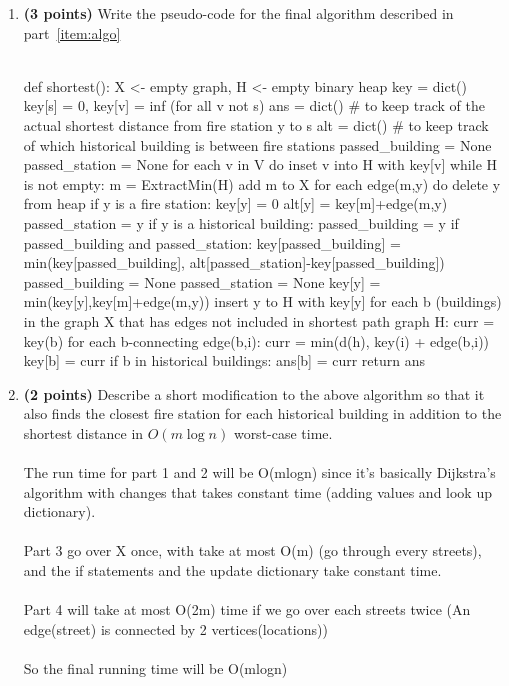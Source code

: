 \documentclass{assignment-373}
\begin{document}
\begin{enumerate}
  
  
\item \textbf{(3 points)} Write the pseudo-code for the final
  algorithm described in part~\ref{item:algo}
  \\\\
  \begin{python}
  def shortest():
    X <- empty graph, H <- empty binary heap
    key = dict()
    key[s] = 0, key[v] = inf (for all v not s)
    ans = dict()
    # to keep track of the actual shortest distance from fire station y to s
    alt = dict() 
    # to keep track of which historical building is between fire stations
    passed_building = None
    passed_station = None
    for each v in V do
        inset v into H with key[v]
    while H is not empty:
        m = ExtractMin(H)
        add m to X
        for each edge(m,y) do 
            delete y from heap
            if y is a fire station:
                key[y] = 0
                alt[y] = key[m]+edge(m,y)
                passed_station = y
            if y is a historical building:
                passed_building = y
            if passed_building and passed_station:
                key[passed_building] = min(key[passed_building],
                alt[passed_station]-key[passed_building])
                passed_building = None
                passed_station = None
            key[y] = min(key[y],key[m]+edge(m,y))
            insert y to H with key[y]
    for each b (buildings) in the graph X that has 
    edges not included in shortest path graph H:
        curr = key(b)
        for each b-connecting edge(b,i):
            curr = min(d(h), key(i) + 
            edge(b,i))
        key[b] = curr
        if b in historical buildings:
            ans[b] = curr
    return ans

  \end{python}
\item \textbf{(2 points)} Describe a short modification to the above
  algorithm so that it also finds the closest fire station for each
  historical building in addition to the shortest distance in
  $O(m \log n)$ worst-case time.\\\\
  \phantom{=} \phantom{=} The run time for part 1 and 2 will be O(mlogn) since it's basically Dijkstra's algorithm with changes that takes constant time (adding values and look up dictionary).\\
  \\
  \phantom{=} \phantom{=} Part 3 go over X once, with take at most O(m) (go through every streets), and the if statements and the update dictionary take constant time.\\
  \\
  \phantom{=} \phantom{=} Part 4 will take at most O(2m) time if we go over each streets twice (An edge(street) is connected by 2 vertices(locations))\\
  \\
  \phantom{=} \phantom{=} So the final running time will be O(mlogn)\\
\end{enumerate}
\end{document}
